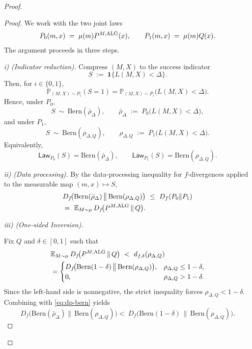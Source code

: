 \documentclass[conference]{IEEEtran}
\begin{document}
\begin{proof}[Proof]
\begin{proof}[Proof]
We work with the two joint laws
\[
P_0(m,x)\;=\;\mu(m)P^{M,\textup{ALG}}(x), \qquad 
P_1(m,x)\;=\;\mu(m)Q(x).
\]
The argument proceeds in three steps.

\emph{i) (Indicator reduction).}
Compress \((M,X)\) to the success indicator
\[
S\;:=\;\mathbf 1\{L(M,X)<\Delta\}.
\]
Then, for \(i\in\{0,1\}\),
\[
\mathbb P_{(M,X)\sim P_i}(S=1)
= \mathbb P_{(M,X)\sim P_i}\!\big(L(M,X)<\Delta\big).
\]
Hence, under \(P_0\),
\[
S\ \sim\ \mathrm{Bern}(\bar\rho_\Delta),
\qquad 
\bar\rho_\Delta\;:=\;P_0\!\big(L(M,X)<\Delta\big),
\]
and under \(P_1\),
\[
S\ \sim\ \mathrm{Bern}(\rho_{\Delta,Q}),
\qquad 
\rho_{\Delta,Q}\;:=\;P_1\!\big(L(M,X)<\Delta\big).
\]
Equivalently,
\[
\mathsf{Law}_{P_0}(S)=\mathrm{Bern}(\bar\rho_\Delta),
\qquad
\mathsf{Law}_{P_1}(S)=\mathrm{Bern}(\rho_{\Delta,Q}).
\]

\emph{ii) (Data processing).}
By the data-processing inequality for \(f\)-divergences applied to the measurable map \((m,x)\mapsto S\),
\begin{equation}
\label{eq:dp-bern}
\begin{aligned}
    &D_f\!\big(\mathrm{Bern}(\bar\rho_\Delta)\,\big\|\,\mathrm{Bern}(\rho_{\Delta,Q})\big)
    \ \le\
    D_f(P_0\|P_1)
    \\
    &=\
    \mathbb{E}_{M\sim\mu}\, D_f\!\big(P^{M,\textup{ALG}}\,\|\,Q\big).
\end{aligned}
\end{equation}

\emph{iii) (One-sided Inversion).}

Fix \(Q\) and \(\delta\in[0,1]\) such that
\[
\begin{aligned}
&\mathbb{E}_{M\sim\mu}\, D_f\!\big(P^{M,\textup{ALG}}\,\|\,Q\big)
\ <\ d_{f,\delta}(\rho_{\Delta,Q})
\\
&=
\begin{cases}
D_f\!\big(\mathrm{Bern}(1-\delta)\,\big\|\,\mathrm{Bern}(\rho_{\Delta,Q})\big), & \rho_{\Delta,Q}\le 1-\delta,\\
0, & \rho_{\Delta,Q}>1-\delta.
\end{cases}
\end{aligned}
\]
Since the left-hand side is nonnegative, the strict inequality forces \(\rho_{\Delta,Q}<1-\delta\).
Combining with \eqref{eq:dp-bern} yields
\[
D_f\!\big(\mathrm{Bern}(\bar\rho_\Delta)\big\|\,\mathrm{Bern}(\rho_{\Delta,Q})\big)
\!\!<\!\!\!\
D_f\!\big(\mathrm{Bern}(1-\delta)\,\big\|\,\mathrm{Bern}(\rho_{\Delta,Q})\big).
\]


\end{proof}
\end{proof}
\end{document}
